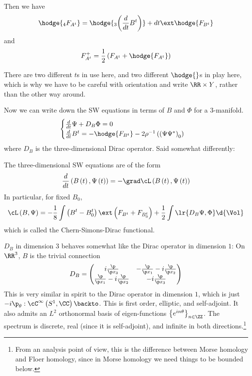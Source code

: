 \documentclass{amsart}
\begin{document}
Then we have
\begin{equation}
\hodge{_4 F_{A^t}} = \hodge{_3\left( \frac{d}{dt} B^t \right)} + 
dt\ext \hodge{F_{B^t}}
\end{equation}
and
\begin{equation}
F_{A^t}^+ = \frac{1}{2}\left( F_{A^t} + \hodge{F_{A^t}} \right)
\end{equation}

\begin{wrn}
There are two different $t$s in use here, and two different $\hodge{}$s
in play here, which is why we have to be careful with orientation
and write $\RR\times Y$, rather than the other way around.
\end{wrn}

Now we can write down the SW equations in terms of $B$ and $\Phi$ for a $3$-manifold.
\begin{equation}
\begin{cases}
\frac{d}{dt}\Psi + D_B \Phi = 0 \\
\frac{d}{dt} B^t = -\hodge{F_{B^t}} - 2\rho^{-1}
\left( \left( \Psi \Psi^* \right)_0 \right)
\end{cases}
\end{equation}
where $D_B$ is the three-dimensional Dirac operator.
Said somewhat differently:

\begin{fact}
The three-dimensional SW equations are of the form 
\begin{equation}
\frac{d}{dt} \left( B\left( t \right) , \Psi\left( t \right) \right) = 
-\grad \cL\left( B\left( t \right) , \Psi\left( t \right) \right)
\end{equation}
In particular, for fixed $B_0$, 
\begin{equation}
\cL\left( B, \Psi \right) = 
-\frac{1}{8}
\int\left( B^t - B_0^t \right)
\ext\left( F_{B^t} + F_{B_0^t}  \right)
+ \frac{1}{2} \int \lr{D_B \Psi , \Phi} \d{\Vol}
\end{equation}
which is called the Chern-Simons-Dirac functional.
\end{fact}

\begin{rmk}
$D_B$ in dimension $3$ behaves somewhat like the Dirac operator in dimension $1$:
On $\RR^3$, $B$ is the trivial connection
\begin{equation}
D_B = \begin{pmatrix}
i \frac{\p}{\p x_3} &
-\frac{\p}{\p x_1} - i \frac{\p}{\p x_2} \\
\frac{\p }{\p x_1} - i \frac{\p}{\p x_2}&
-i \frac{\p}{\p x_3}
\end{pmatrix}
\end{equation}
This is very similar in spirit to the Dirac operator in dimension $1$, which is just
$-i \p_\theta: \cC^\infty\left( S^1 , \CC \right) \backto$.
This is first order, elliptic, and self-adjoint. 
It also admits an $L^2$ orthonormal basis of eigen-functions
$\left\{ e^{in\theta} \right\}_{n\in \ZZ}$.
The spectrum is discrete, real (since it is self-adjoint), and infinite in both directions.\footnote{
From an analysis point of view, this is the difference between Morse homology
and Floer homology, since in Morse homology we need things to be bounded below.}
\end{rmk}
\end{document}
